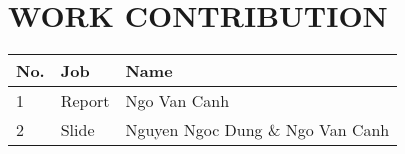 \section*{WORK CONTRIBUTION}
 {}

\begin{table}[!ht]
\begin{tabular}{|l|l|l|}
    \hline
    \textbf{No.}    & \textbf{Job}      & \textbf{Name} \\ \hline
    1               & Report            & Ngo Van Canh  \\ \hline
    2               & Slide             & Nguyen Ngoc Dung \& Ngo Van Canh \\ \hline
\end{tabular}
\end{table}

\newpage